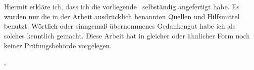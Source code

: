 \chapter*{\DICTDeclarationOnHonour}
\addstarredchapter{\DICTDeclarationOnHonour}

\markboth{\MakeUppercase{\DICTDeclarationOnHonour}}{\MakeUppercase{\DICTDeclarationOnHonour}}

Hiermit erkläre ich, dass ich die vorliegende \DICTDocType~selbständig angefertigt habe. Es wurden nur die in der Arbeit ausdrücklich benannten Quellen und Hilfsmittel benutzt. Wörtlich oder sinngemaß übernommenes Gedankengut habe ich als solches kenntlich gemacht. Diese Arbeit hat in gleicher oder ähnlicher Form noch keiner Prüfungsbehörde vorgelegen.
\vspace{20mm}

\DICTDocPlace, \DICTDocDueDate
\vspace{10mm}

\underline{\hspace{8cm}}\\\DICTDocAuthor